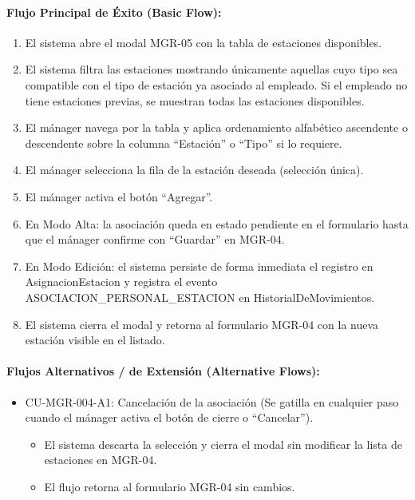 \paragraph{Flujo Principal de Éxito (Basic Flow):}
\begin{enumerate}
    \item[I.] El sistema abre el modal MGR-05 con la tabla de estaciones disponibles.
    \item[II.] El sistema filtra las estaciones mostrando únicamente aquellas cuyo tipo sea compatible con el tipo de estación ya asociado al empleado. Si el empleado no tiene estaciones previas, se muestran todas las estaciones disponibles.
    \item[III.] El mánager navega por la tabla y aplica ordenamiento alfabético ascendente o descendente sobre la columna ``Estación'' o ``Tipo'' si lo requiere.
    \item[IV.] El mánager selecciona la fila de la estación deseada (selección única).
    \item[V.] El mánager activa el botón ``Agregar''.
    \item[VI.] En Modo Alta: la asociación queda en estado pendiente en el formulario hasta que el mánager confirme con ``Guardar'' en MGR-04.
    \item[VII.] En Modo Edición: el sistema persiste de forma inmediata el registro en AsignacionEstacion y registra el evento ASOCIACION\_PERSONAL\_ESTACION en HistorialDeMovimientos.
    \item[VIII.] El sistema cierra el modal y retorna al formulario MGR-04 con la nueva estación visible en el listado.
\end{enumerate}

\paragraph{Flujos Alternativos / de Extensión (Alternative Flows):}
\begin{itemize}
    \item CU-MGR-004-A1: Cancelación de la asociación (Se gatilla en cualquier paso cuando el mánager activa el botón de cierre o ``Cancelar'').
    \begin{itemize}
        \item El sistema descarta la selección y cierra el modal sin modificar la lista de estaciones en MGR-04.
        \item El flujo retorna al formulario MGR-04 sin cambios.
    \end{itemize}
\end{itemize}

